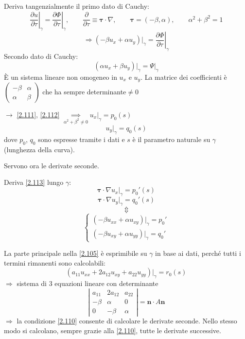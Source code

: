\documentclass[a4paper,11pt]{report}
\newcommand{\vect}[1]{\boldsymbol{#1}}
\begin{document}
Deriva tangenzialmente il primo dato di Cauchy:
\[
\left.\frac{\partial u}{\partial \tau}\right|_{\gamma} = \left. \frac{\partial \Phi}{\partial \tau}\right|_{\gamma}, \qquad
\frac{\partial}{\partial \tau} \equiv \vect{\tau}\cdot \nabla, \qquad 
\vect{\tau}= (-\beta,\alpha), \qquad 
\alpha^2 + \beta^2 =1
\]
\begin{equation}
\Rightarrow (-\beta u_x +\alpha u_y) \big|_{\gamma}=\left.\frac{\partial \Phi}{\partial \tau}\right|_{\gamma}
\label{2.111}
\end{equation}
Secondo dato di Cauchy:
\begin{equation}
(\alpha u_x + \beta u_y) \big|_{\gamma} = \Psi|_{\gamma}
\label{2.112}
\end{equation}
\`E un sistema lineare non omogeneo in $u_x$ e $u_y$.
La matrice dei coefficienti \`e $\left( \begin{matrix} -\beta & \alpha \\ \alpha & \beta \end{matrix} \right)$ che ha sempre determinante$\neq0$

$\rightarrow$ \eqref{2.111}, \eqref{2.112} $\underset{\alpha^2 + \beta^2 \neq 0}{\implies} u_x \big|_{\gamma}=p_0(s)$
\begin{equation}
u_y \big|_{\gamma}=q_0(s)
\label{2.113}
\end{equation}
dove $p_0$, $q_0$ sono espresse tramite i dati e $s$ \`e il parametro naturale su $\gamma$ (lunghezza della curva).

Servono ora le derivate seconde.

Deriva \eqref{2.113} lungo $\gamma$:
\[
\vect{\tau}\cdot \nabla u_x \big|_{\gamma}= p_0'(s)
\]
\[
\vect{\tau}\cdot \nabla u_y \big|_{\gamma}=q_0'(s)
\]
\[
\Updownarrow
\]
\[
\begin{cases}
(-\beta u_{xx} + \alpha u_{xy}) \big|_{\gamma}=p_0'\\
(-\beta u_{xy} + \alpha u_{yy}) \big|_{\gamma}=q_0'
\end{cases}
\]

La parte principale nella \eqref{2.105} \`e esprimibile su $\gamma$ in base ai dati, perch\'e tutti i termini rimanenti sono calcolabili:
\[
(a_{11}u_{xx}+2a_{12}u_{xy}+a_{22}u_{yy}) \big|_{\gamma}=r_0(s)
\]
$\Rightarrow$ sistema di 3 equazioni lineare con determinante
\begin{equation}
\left| \begin{matrix}
a_{11} & 2a_{12} & a_{22}\\
-\beta & \alpha & 0 \\
0 & -\beta & \alpha 
\end{matrix}\right| = \vect{n}\cdot A \vect{n}
\label{2.114}
\end{equation}
$\Rightarrow$ la condizione \eqref{2.110} consente di calcolare le derivate seconde. Nello stesso modo si calcolano, sempre grazie alla \eqref{2.110}, tutte le derivate successive.
\end{document}
